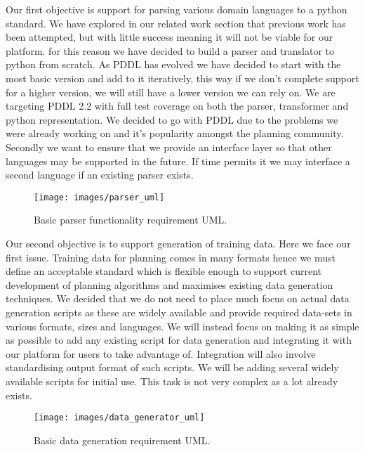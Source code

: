 Our first objective is support for parsing various domain languages to a python standard. We have explored in our related work section that previous work has been attempted, but with little success meaning it will not be viable for our platform. for this reason we have decided to build a parser and translator to python from scratch. As PDDL has evolved we have decided to start with the most basic version and add to it iteratively, this way if we don't complete support for a higher version, we will still have a lower version we can rely on. We are targeting PDDL 2.2 with full test coverage on both the parser, transformer and python representation. We decided to go with PDDL due to the problems we were already working on and it's popularity amongst the planning community. Secondly we want to ensure that we provide an interface layer so that other languages may be supported in the future. If time permits it we may interface a second language if an existing parser exists.

\begin{figure}[h]
\centering
 \texttt{[image: images/parser\_uml]}
 \caption{Basic parser functionality requirement UML.}
 \label{fig:parser-uml}
\end{figure}
\newpage
Our second objective is to support generation of training data. Here we face our first issue. Training data for planning comes in many formats hence we must define an acceptable standard which is flexible enough to support current development of planning algorithms and maximises existing data generation techniques. We decided that we do not need to place much focus on actual data generation scripts as these are widely available and provide required data-sets in various formats, sizes and languages. We will instead focus on making it as simple as possible to add any existing script for data generation and integrating it with our platform for users to take advantage of. Integration will also involve standardising output format of such scripts. We will be adding several widely available scripts for initial use. This task is not very complex as a lot already exists. 
\begin{figure}[h]
\centering
 \texttt{[image: images/data\_generator\_uml]}
 \caption{Basic data generation requirement UML.}
 \label{fig:data-generator-uml}
\end{figure}


